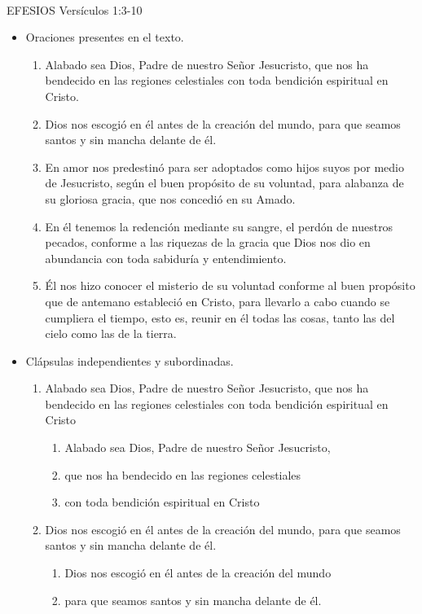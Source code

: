 \documentclass[11pt,letterpaper]{article}
\author{Ciencias}
\begin{document}
	\\
	{\large EFESIOS Versículos 1:3-10}\\
	
	\begin{itemize}
		\item {\large Oraciones presentes en el texto.}
		\begin{enumerate}
			\item Alabado sea Dios, Padre de nuestro Señor Jesucristo, que nos ha bendecido en las regiones celestiales con toda bendición espiritual en Cristo.
			\item Dios nos escogió en él antes de la creación del mundo, para que seamos santos y sin mancha delante de él.
			\item En amor nos predestinó para ser adoptados como hijos suyos por medio de Jesucristo, según el buen propósito de su voluntad, para alabanza de su gloriosa gracia, que nos concedió en su Amado.
			\item En él tenemos la redención mediante su sangre, el perdón de nuestros pecados, conforme a las riquezas de la gracia que Dios nos dio en abundancia con toda sabiduría y entendimiento.
			\item Él nos hizo conocer el misterio de su voluntad conforme al buen propósito que de antemano estableció en Cristo, para llevarlo a cabo cuando se cumpliera el tiempo, esto es, reunir en él todas las cosas, tanto las del cielo como las de la tierra.
		\end{enumerate}
		\item {\large Clápsulas independientes y subordinadas.} 
		\begin{enumerate}
			\item Alabado sea Dios, Padre de nuestro Señor Jesucristo, que nos ha bendecido en las regiones celestiales con toda bendición espiritual en Cristo
			\begin{enumerate}
				\item Alabado sea Dios, Padre de nuestro Señor Jesucristo,
				\item que nos ha bendecido en las regiones celestiales 
				\item con toda bendición espiritual en Cristo
			\end{enumerate}
			\item Dios nos escogió en él antes de la creación del mundo, para que seamos santos y sin mancha delante de él.
			\begin{enumerate}
				\item Dios nos escogió en él antes de la creación del mundo
				\item para que seamos santos y sin mancha delante de él.
			\end{enumerate}
		\end{enumerate}
	\end{itemize}

	
	
\end{document}
